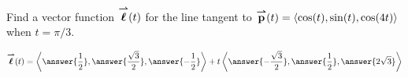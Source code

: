 \documentclass{ximera}
\author{David Guichard \and Neal Koblitz \and H. Jerome Keisler \and Albert Scheller \and Barry Balof \and Mike Wills \and Matthew Carr}
\begin{document}
\begin{exercise}
Find a vector function ${\overset{\boldsymbol{\rightharpoonup}}{\mathbf{\boldsymbol{\ell}}}}(t)$ for the line tangent to
${\overset{\boldsymbol{\rightharpoonup}}{\mathbf{p}}}(t)=\left\langle \cos(t),\sin(t),\cos(4t)\right\rangle$ when $t=\pi/3$.

\begin{prompt}
\[
\vecl(t)=\vector{\answer{\frac{1}{2}},\answer{\frac{\sqrt{3}}{2}},\answer{-\frac{1}{2}}}+t\vector{\answer{-\frac{\sqrt{3}}{2}},\answer{\frac{1}{2}},\answer{2\sqrt{3}}}
\]
\end{prompt}


\end{exercise}
\end{document}
